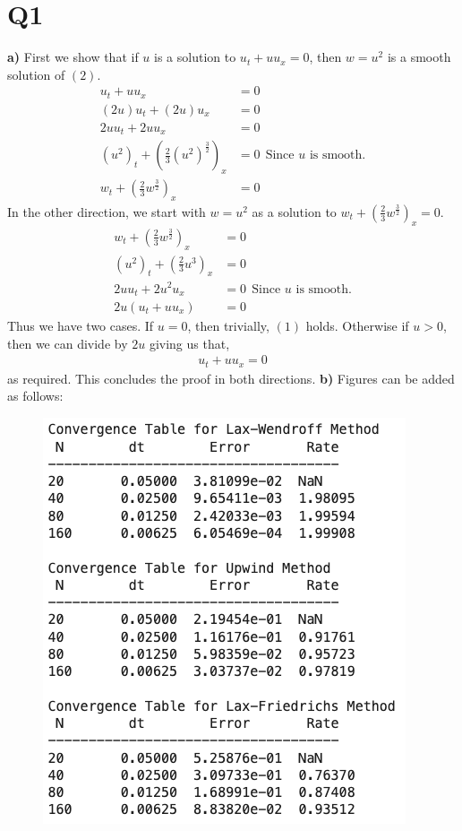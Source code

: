 \pagebreak

\section*{Q1}
\begin{solution}[\textbf{2}]
\hfill\break
\textbf{a)} First we show that if $u$ is a solution to $u_t +  uu_x = 0$, then $w = u^2$ is a smooth solution of $(2)$. 
\begin{align*}
    u_t + uu_x &= 0 \\
    (2u)u_t + (2u)u_x &= 0 \\
    2uu_t + 2uu_x &= 0 \\
    \left(u^2\right)_t + \left(\frac{2}{3} (u^2)^{\frac{3}{2}}\right)_x &= 0 \ \ \text{Since $u$ is smooth.} \\
    w_t + \left(\frac{2}{3} w ^{\frac{3}{2}}    \right)_x &= 0
\end{align*}
In the other direction, we start with $w = u^2$ as a solution to $w_t + \left(\frac{2}{3}w^{\frac{3}{2}}\right)_x  = 0$.
\begin{align*}
    w_t + \left(\frac{2}{3}w^{\frac{3}{2}}\right)_x &= 0 \\
    (u^2)_t + \left(\frac{2}{3}u^{3}\right)_x &= 0 \\
    2uu_t + 2u^2u_x &= 0 \ \ \text{Since $u$ is smooth.} \\
    2u(u_t + uu_x) &= 0
\end{align*}
Thus we have two cases. If $u = 0$, then trivially, $(1)$ holds. Otherwise if $u > 0$, then we can divide by $2u$ giving us that,
\begin{align*}
u_t + uu_x = 0
\end{align*}
as required. This concludes the proof in both directions.
\hfill\break
\hfill\break
\textbf{b)}  Figures can be added as follows:
\begin{figure}[H]
    \centering
    \includegraphics[scale=0.35]{./figures/q2-table.png}
\end{figure}
\end{solution}

